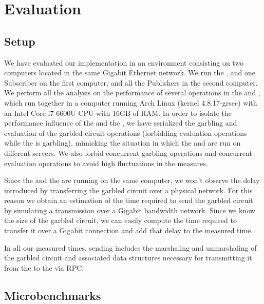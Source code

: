 \section{Evaluation}
\label{sec:evaluation}

\subsection{Setup}

We have evaluated our implementation in an environment consisting on two
computers located in the same Gigabit Ethernet network.  We run the \broker,
\garbler and one Subscriber on the first computer, and all the Publishers in
the second computer.  We perform all the analysis on the performance of several
operations in the \broker and \garbler, which run together in a computer
running Arch Linux (kernel 4.8.17-grsec) with an Intel Core i7-6600U CPU with
16GB of RAM.  In order to isolate the performance influence of the \broker and
the \garbler, we have serialized the garbling and evaluation of the garbled
circuit operations (forbidding evaluation operations while the \garbler is
garbling), mimicking the situation in which the \broker and \garbler are run on
different servers.  We also forbid concurrent garbling operations and
concurrent evaluation operations to avoid high fluctuations in the measures.

Since the \broker and the \garbler are running on the same computer, we won't
observe the delay introduced by transferring the garbled circuit over a
physical network.  For this reason we obtain an estimation of the time required
to send the garbled circuit by simulating a transmission over a Gigabit
bandwidth network.  Since we know the size of the garbled circuit, we can
easily compute the time required to transfer it over a Gigabit connection and
add that delay to the measured time.

In all our measured times, sending includes the marshaling and unmarshaling of
the garbled circuit and associated data structures necessary for transmitting
it from the \garbler to the \broker via RPC.

\subsection{Microbenchmarks}

